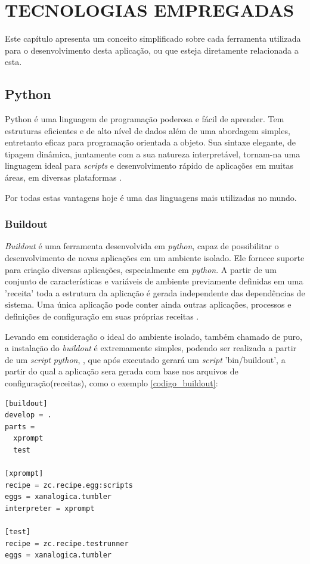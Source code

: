 \chapter{TECNOLOGIAS EMPREGADAS}
\thispagestyle{empty}

Este capítulo apresenta um conceito simplificado sobre cada ferramenta utilizada para o desenvolvimento desta aplicação, ou que esteja diretamente relacionada a esta.


\section{Python}

Python é uma linguagem de programação poderosa e fácil de aprender. Tem estruturas eficientes e de alto nível de dados além de uma abordagem simples, entretanto eficaz para programação orientada a objeto. Sua sintaxe elegante, de tipagem dinâmica, juntamente com a sua natureza interpretável, tornam-na uma linguagem ideal para \textit{scripts} e desenvolvimento rápido de aplicações em muitas áreas, em diversas plataformas \cite{GUIDO}.

Por todas estas vantagens hoje é uma das linguagens mais utilizadas no mundo.


\subsection{Buildout}
\label{buildout}

\textit{Buildout} é uma ferramenta desenvolvida em \textit{python}, capaz de possibilitar o desenvolvimento de novas aplicações em um ambiente isolado. Ele fornece suporte para criação diversas aplicações, especialmente em \textit{python}. A partir de um conjunto de características e variáveis de ambiente previamente definidas em uma 'receita' toda a estrutura da aplicação é gerada independente das dependências de sistema. Uma única aplicação pode conter ainda outras aplicações, processos e definições de configuração em suas próprias receitas \cite{BRANDOM}.

Levando em consideração o ideal do ambiente isolado, também chamado de puro, a instalação do \textit{buildout} é extremamente simples, podendo ser realizada a partir de um \textit{script} \textit{python}, \cite{BOOTSTRAP}, que após executado gerará um \textit{script} 'bin/buildout', a partir do qual a aplicação sera gerada com base nos arquivos de configuração(receitas), como o exemplo \ref{codigo_buildout}:

{\singlespace
\begin{lstlisting}[caption=Exemplo de um \textit{script buildout},language=python,label={codigo_buildout}]
[buildout]
develop = .
parts = 
  xprompt
  test

[xprompt]
recipe = zc.recipe.egg:scripts
eggs = xanalogica.tumbler
interpreter = xprompt

[test]
recipe = zc.recipe.testrunner
eggs = xanalogica.tumbler
\end{lstlisting}
}

